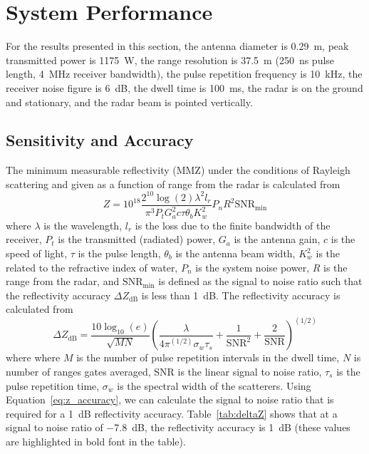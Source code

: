 \documentclass[12pt,letterpaper]{article}
\begin{document}
\section{System Performance}
\label{sec:system_performance}

For the results presented in this section, the antenna diameter is
0.29~m, peak transmitted power is 1175~W, the range resolution is
37.5~m (250~ns pulse length, 4~MHz receiver bandwidth), the pulse
repetition frequency is 10~kHz, the receiver noise figure is 6~dB, the
dwell time is 100~ms, the radar is on the ground and stationary, and
the radar beam is pointed vertically.

\subsection{Sensitivity and Accuracy}

The minimum measurable reflectivity (MMZ) under the conditions of
Rayleigh scattering and given as a function of range from the radar is
calculated from
\begin{equation}
  Z=10^{18}\frac{2^{10}\log(2)\lambda^2l_r}{\pi^3P_tG_a^2c{\tau}{\theta_b}K_w^2}P_nR^2\text{SNR}_\text{min}
  \label{eq:mdz}
\end{equation}
where $\lambda$ is the wavelength, $l_r$ is the loss due to the finite
bandwidth of the receiver, $P_t$ is the transmitted (radiated) power,
$G_a$ is the antenna gain, $c$ is the speed of light, $\tau$ is the
pulse length, $\theta_b$ is the antenna beam width, $K_w^2$ is the
related to the refractive index of water, $P_n$ is the system noise
power, $R$ is the range from the radar, and $\text{SNR}_\text{min}$ is
defined as the signal to noise ratio such that the reflectivity
accuracy $\Delta Z_\text{dB}$ is less than 1~dB. The reflectivity
accuracy is calculated from \cite{doviak:93, hogan:05}
\begin{equation}
  \Delta Z_\text{dB} = \frac{10\log_{10}(e)}{\sqrt{MN}}\left(\frac{\lambda}{4\pi^{(1/2)}\sigma_w\tau_s}+\frac{1}{\text{SNR}^2}+\frac{2}{\text{SNR}}\right)^{(1/2)}
  \label{eq:z_accuracy}
\end{equation}
where where $M$ is the number of pulse repetition intervals in the
dwell time, $N$ is number of ranges gates averaged, SNR is the linear
signal to noise ratio, $\tau_s$ is the pulse repetition time,
$\sigma_w$ is the spectral width of the scatterers. Using
Equation~\ref{eq:z_accuracy}, we can calculate the signal to noise
ratio that is required for a 1~dB reflectivity
accuracy. Table~\ref{tab:deltaZ} shows that at a signal to noise ratio
of $-$7.8~dB, the reflectivity accuracy is 1~dB (these values are
highlighted in bold font in the table).
\end{document}
